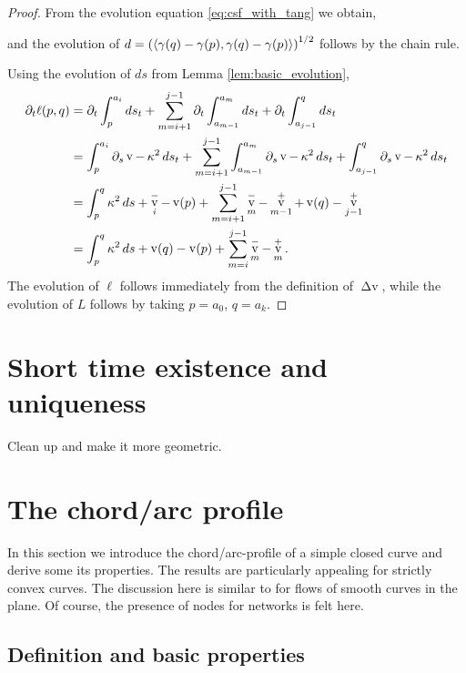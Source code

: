 \documentclass[11pt]{amsart}
\DeclareMathOperator{\tangspeed}{v}
\DeclareMathOperator{\corneranglespeed}{{\Delta v}}
\begin{document}
\begin{proof}
From the evolution equation \eqref{eq:csf_with_tang} we obtain,

and the evolution of \(d = \left(\langle{\gamma(q) - \gamma(p)},{\gamma(q) - \gamma(p)}\rangle\right)^{1/2}\) follows by the chain rule.

Using the evolution of \(ds\) from Lemma \ref{lem:basic_evolution},
\begin{align*}
\partial_t \ell(p,q) &= \partial_t \int_p^{a_i} ds_t + \sum_{m=i+1}^{j-1} \partial_t \int_{a_{m-1}}^{a_m} ds_t + \partial_t  \int_{a_{j-1}}^q ds_t \\
&= \int_p^{a_i} \partial_s \tangspeed - \curvecurv^2 ds_t + \sum_{m=i+1}^{j-1} \int_{a_{m-1}}^{a_m} \partial_s \tangspeed - \curvecurv^2 ds_t + \int_{a_{j-1}}^q \partial_s \tangspeed - \curvecurv^2 ds_t \\
&= \int_p^q \curvecurv^2 ds + \tangspeed_i^- - \tangspeed(p) + \sum_{m=i+1}^{j-1} \tangspeed_m^- - \tangspeed_{m-1}^+ + \tangspeed(q) - \tangspeed_{j-1}^+ \\
&= \int_p^q \curvecurv^2 ds + \tangspeed(q) - \tangspeed(p) + \sum_{m=i}^{j-1} \tangspeed_m^- - \tangspeed_m^+.
\end{align*}
The evolution of \(\ell\) follows immediately from the definition of \(\corneranglespeed\), while the evolution of \(L\) follows by taking \(p=a_0\), \(q=a_k\).
\end{proof}


\section{Short time existence and uniqueness}
\label{sec:orgheadline6}
Clean up \cite{MR1240580} and make it more geometric.
\section{The chord/arc profile}
\label{sec:orgheadline10}

In this section we introduce the chord/arc-profile of a simple closed curve and derive some its properties. The results are particularly appealing for strictly convex curves. The discussion here is similar to \cite{alpha_csf_dist_comp} for flows of smooth curves in the plane. Of course, the presence of nodes for networks is felt here.

\subsection{Definition and basic properties}
\label{sec:orgheadline7}
\end{document}
